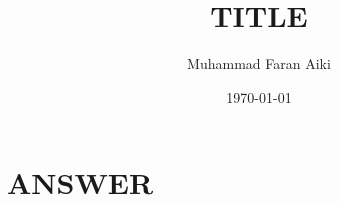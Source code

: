 \documentclass[a4paper, 12pt]{article}
\title{TITLE}
\author{Muhammad Faran Aiki}
\date{\today}
\begin{document}
	\maketitle

	\section{ANSWER}
\end{document}
